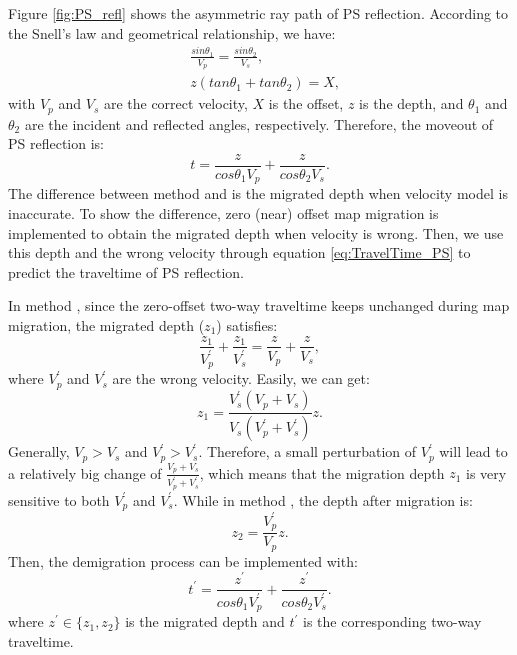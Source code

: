 Figure \ref{fig:PS_refl} shows the asymmetric ray path of PS reflection.
According to the Snell's law and geometrical relationship, we have:
\begin{equation}
\begin{split}
    &\frac{sin\theta_1}{V_p}=\frac{sin\theta_2}{V_s},\\
	&z(tan\theta_1+tan\theta_2)=X,
\end{split}
    \label{eq:Snell_PS} 
\end{equation}
with $V_p$ and $V_s$ are the correct velocity, $X$ is the offset, $z$ is the depth, 
and $\theta_1$ and $\theta_2$ are the incident and reflected angles, respectively.
Therefore, the moveout of PS reflection is:
\begin{equation}
	t=\frac{z}{cos\theta_1V_p}+\frac{z}{cos\theta_2V_s}.
    \label{eq:TravelTime_PS} 
\end{equation}
The difference between method {\bf\uppercase\expandafter{}} and {\bf\uppercase\expandafter{}} 
is the migrated depth when velocity model is inaccurate. 
To show the difference, zero (near) offset map migration is implemented
to obtain the migrated depth when velocity is wrong. Then, we use this depth and the
wrong velocity through equation \eqref{eq:TravelTime_PS} to predict the traveltime of PS reflection.

In method {\bf\uppercase\expandafter{}}, since the zero-offset two-way traveltime
keeps unchanged during map migration, the migrated depth ($z_{1}$) satisfies:
\begin{equation}
	\frac{z_{1}}{V^{'}_p}+\frac{z_{1}}{V^{'}_s}=\frac{z}{V_p}+\frac{z}{V_s},
	\label{eq:Mapmigration_PS} 
\end{equation}
where $V^{'}_p$ and $V^{'}_s$ are the wrong velocity. Easily, we can get:
\begin{equation}
	{z_{1}}=\frac{V^{'}_s(V_p+V_s)}{V_s(V^{'}_p+V^{'}_s)}z.
    \label{eq:ZerooffMig_PS} 
\end{equation}
Generally, $V_p>V_s$ and $V^{'}_p>V^{'}_s$. Therefore, a small perturbation of
$V^{'}_p$ will lead to a relatively big change of $\frac{V_p+V_s}{V^{'}_p+V^{'}_s}$, which
means that the migration depth $z_{1}$ is very sensitive to both $V^{'}_p$ and $V^{'}_s$. 
While in method \uppercase\expandafter{}, the depth after migration is: 
\begin{equation}
	{z_{2}}=\frac{V^{'}_p}{V_p}z.
    \label{eq:ZerooffMig_PP} 
\end{equation}
Then, the demigration process can be implemented with:
\begin{equation}
	t^{'}=\frac{z^{'}}{cos\theta_1V^{'}_p}+\frac{z^{'}}{cos\theta_2V^{'}_s}.
    \label{eq:Demigration_PS} 
\end{equation}
where $z^{'}\in\{z_1,z_2\}$ is the migrated depth and $t^{'}$ is the corresponding two-way traveltime.

